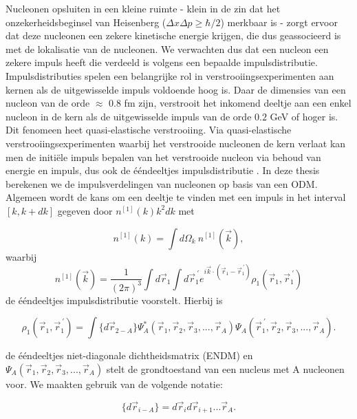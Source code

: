 \documentclass[11pt,twoside]{book}
\begin{document}
Nucleonen opsluiten in een kleine ruimte - klein in de zin dat het onzekerheidsbeginsel van Heisenberg ($\Delta x \Delta p \geq \hbar/2$) merkbaar is - zorgt ervoor dat deze nucleonen een zekere kinetische energie krijgen, die dus geassocieerd is met de lokalisatie van de nucleonen. We verwachten dus dat een nucleon een zekere impuls heeft die verdeeld is volgens een bepaalde impulsdistributie. Impulsdistributies spelen een belangrijke rol in verstrooiingsexperimenten aan kernen als de uitgewisselde impuls voldoende hoog is. Daar de dimensies van een nucleon van de orde $\approx$ 0.8 fm zijn, verstrooit het inkomend deeltje aan een enkel nucleon in de kern als de uitgewisselde impuls van de orde $0.2$ GeV of hoger is. Dit fenomeen heet quasi-elastische verstrooiing. Via quasi-elastische verstrooiingsexperimenten waarbij het verstrooide nucleonen de kern verlaat kan men de initi\"{e}le impuls bepalen van het verstrooide nucleon via behoud van energie en impuls, dus ook de \'{e}\'{e}ndeeltjes  impulsdistributie \cite{kobayashi}. In deze thesis berekenen we de impulsverdelingen van nucleonen op basis van een ODM.
Algemeen wordt de kans om een deeltje te vinden met een impuls in het interval $[k,k+dk]$ gegeven door $n^{[1]}(k) k^2dk$ met

\begin{equation} \label{eq:one_patricle_distr}
	n^{[1]}(k)=\int d\Omega_k\ n^{[1]}(\vec{k}),
\end{equation}
waarbij
\begin{equation} 
	n^{[1]}(\vec{k})=\frac{1}{(2\pi)^3}\int d\vec{r}_1 \int d\vec{r}_1^{\ \prime} e^{i\vec{k}\cdot (\vec{r}_1-\vec{r}^{\ \prime}_1)}\rho_1(\vec{r}_1,\vec{r}_1^{\ \prime})
\end{equation}
de \'{e}\'{e}ndeeltjes impulsdistributie voorstelt. Hierbij is

\begin{equation}
\rho_1(\vec{r}_1,\vec{r}^{\ \prime}_1) = \int \{d\vec{r}_{2-A}\} \Psi^*_A(\vec{r}_1,\vec{r}_2,\vec{r}_3, ... ,\vec{r}_A)\Psi_A(\vec{r}_1^{\ \prime},\vec{r}_2,\vec{r}_3, ... ,\vec{r}_A).
\end{equation}


de \'{e}\'{e}ndeeltjes niet-diagonale dichtheidsmatrix (ENDM) en $\Psi_A(\vec{r}_1,\vec{r}_2,\vec{r}_3, ... ,\vec{r}_A)$ stelt de grondtoestand van een nucleus met A nucleonen voor. We maakten gebruik van de volgende notatie:

\begin{equation}
\{d\vec{r}_{i-A}\}  = d\vec{r}_i d\vec{r}_{i+1}...\vec{r}_A.
\end{equation}
 
\end{document}
